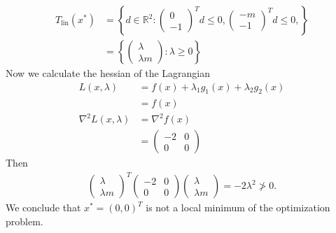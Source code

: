 \begin{align}
    T_\text{lin}(x^{*}) &=
    \left\{
        d \in \mathbb{R}^{2}:
        \begin{pmatrix}
            0\\
            -1
        \end{pmatrix}^{T}
        d \le 0,
        \begin{pmatrix}
            -m\\
            -1
        \end{pmatrix}^{T}
        d \le 0,
    \right\} \\
    &=
    \left\{
        \begin{pmatrix}
            \lambda\\
            \lambda m
        \end{pmatrix}
        :\lambda \ge 0
    \right\}
\end{align}
Now we calculate the hessian of the Lagrangian
\begin{align}
    L(x, \lambda) &= f(x) + \lambda_1 g_1(x) + \lambda_2 g_2(x)\\
            &= f(x)\\
    \nabla^2 L(x, \lambda) &= \nabla^2 f(x)\\
                           &=
    \begin{pmatrix}
        -2 & 0\\
        0 & 0
    \end{pmatrix}
\end{align}
Then
\begin{align}
    \begin{pmatrix}
        \lambda\\
        \lambda m
    \end{pmatrix}^{T}
    \begin{pmatrix}
        -2 & 0\\
        0 & 0
    \end{pmatrix}
    \begin{pmatrix}
        \lambda\\
        \lambda m
    \end{pmatrix} = -2\lambda^{2} \not> 0.
\end{align}
We conclude that $x^{*}=(0,0)^{T}$ is not a local minimum of the optimization
problem.
